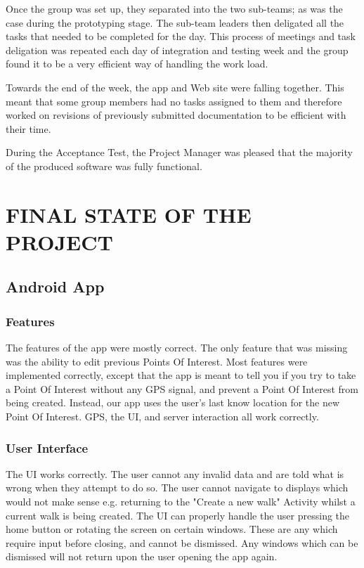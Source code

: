 \documentclass{project}
\begin{document}
Once the group was set up, they separated into the two sub-teams; as was the case during the prototyping stage. The sub-team leaders then deligated all the tasks that needed to be completed for the day. This process of meetings and task deligation was repeated each day of integration and testing week and the group found it to be a very efficient way of handling the work load.

Towards the end of the week, the app and Web site were falling together. This meant that some group members had no tasks assigned to them and therefore worked on revisions of previously submitted documentation to be efficient with their time.

During the Acceptance Test, the Project Manager was pleased that the majority of the produced software was fully functional. 


\newpage


\section{FINAL STATE OF THE PROJECT}
\subsection{Android App}

\subsubsection{Features}
The features of the app were mostly correct. The only feature that was missing was the ability to edit previous
Points Of Interest.
Most features were implemented correctly, except that the app is meant to tell you if you try to take a Point Of Interest
without any GPS signal, and prevent a Point Of Interest from being created. Instead, our app uses the user's last know location
for the new Point Of Interest.
GPS, the UI, and server interaction all work correctly.

\subsubsection{User Interface}
The UI works correctly. The user cannot any invalid data and are told what is wrong when they attempt to do so.
The user cannot navigate to displays which would not make sense e.g. returning to the "Create a new walk" Activity
whilst a current walk is being created.
The UI can properly handle the user pressing the home button or rotating the screen on certain windows. These are
any which require input before closing, and cannot be dismissed. Any windows which can be dismissed will not return
upon the user opening the app again.
\end{document}
